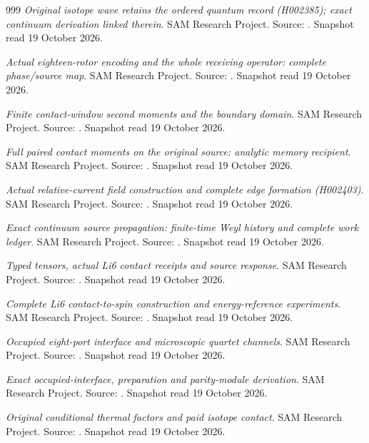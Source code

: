 \begin{thebibliography}{999}
 \emph{Original isotope wave retains the ordered quantum record (H002385); exact continuum derivation linked therein}. SAM Research Project. Source: . Snapshot read 19 October 2026.

 \emph{Actual eighteen-rotor encoding and the whole receiving operator: complete phase/source map}. SAM Research Project. Source: . Snapshot read 19 October 2026.

 \emph{Finite contact-window second moments and the boundary domain}. SAM Research Project. Source: . Snapshot read 19 October 2026.

 \emph{Full paired contact moments on the original source: analytic memory recipient}. SAM Research Project. Source: . Snapshot read 19 October 2026.

 \emph{Actual relative-current field construction and complete edge formation (H002403)}. SAM Research Project. Source: . Snapshot read 19 October 2026.

 \emph{Exact continuum source propagation: finite-time Weyl history and complete work ledger}. SAM Research Project. Source: . Snapshot read 19 October 2026.

 \emph{Typed tensors, actual Li6 contact receipts and source response}. SAM Research Project. Source: . Snapshot read 19 October 2026.

 \emph{Complete Li6 contact-to-spin construction and energy-reference experiments}. SAM Research Project. Source: . Snapshot read 19 October 2026.

 \emph{Occupied eight-port interface and microscopic quartet channels}. SAM Research Project. Source: . Snapshot read 19 October 2026.

 \emph{Exact occupied-interface, preparation and parity-module derivation}. SAM Research Project. Source: . Snapshot read 19 October 2026.

 \emph{Original conditional thermal factors and paid isotope contact}. SAM Research Project. Source: . Snapshot read 19 October 2026.


\end{thebibliography}
